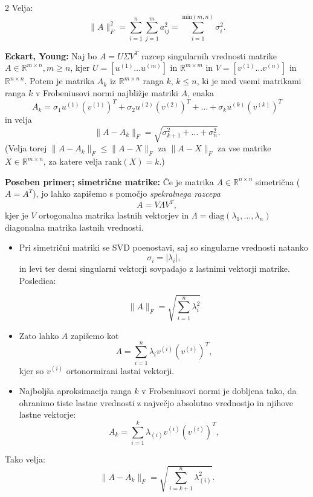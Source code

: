 \documentclass{article}
\begin{document}
\begin{multicols}{2}
	Velja:
	\[
		\|A\|_F^2 = \sum_{i=1}^{n} \sum_{j=1}^{m} a_{ij}^2 = \sum_{i=1}^{\text{min}(m,n)} \sigma_i^2.
	\]


	\textbf{Eckart, Young:} Naj bo \( A = U\Sigma V^T \) razcep singularnih vrednosti matrike \( A \in \mathbb{R}^{m \times n}, m \geq n \), kjer \( U = [u^{(1)} \ldots u^{(m)}] \) in \( \mathbb{R}^{m \times m} \) in \( V = [v^{(1)} \ldots v^{(n)}] \) in \( \mathbb{R}^{n \times n} \). Potem je matrika \( A_k \) iz \( \mathbb{R}^{m \times n} \) ranga \( k \), \( k \leq n \), ki je med vsemi matrikami ranga \( k \) v Frobeniusovi normi najbližje matriki \( A \), enaka
	\[
		A_k = \sigma_1 u^{(1)}(v^{(1)})^T + \sigma_2 u^{(2)}(v^{(2)})^T + \ldots + \sigma_k u^{(k)}(v^{(k)})^T
	\]
	in velja
	\[
		\| A - A_k \|_F = \sqrt{\sigma_{k+1}^2 + \ldots + \sigma_n^2}.
	\]
	(Velja torej \( \|A - A_k\|_F \leq \|A - X\|_F \) za \( \|A - X\|_F \) za vse matrike \( X \in \mathbb{R}^{m \times n} \), za katere velja \( \text{rank}(X) = k \).)

	\textbf{Poseben primer; simetrične matrike: }
	Če je matrika \( A \in \mathbb{R}^{n \times n} \) simetrična (\( A = A^T \)), jo lahko zapišemo s pomočjo
	\emph{spekralnega razcepa}
	\[
		A = V \Lambda V^T,
	\]
	kjer je \( V \) ortogonalna matrika lastnih vektorjev in \( \Lambda = \mathrm{diag}(\lambda_1, \ldots, \lambda_n) \) diagonalna matrika lastnih vrednosti.

	\begin{itemize}
		\item Pri simetrični matriki se SVD poenostavi, saj so singularne vrednosti natanko
		      \[
			      \sigma_i = |\lambda_i|,
		      \]
		      in levi ter desni singularni vektorji sovpadajo z lastnimi vektorji matrike.
		      Posledica:

		      \[
			      \|A\|_F = \sqrt{\sum_{i=1}^{n} \lambda_i^2}
		      \]
		\item Zato lahko \( A \) zapišemo kot
		      \[
			      A = \sum_{i=1}^n \lambda_i v^{(i)} (v^{(i)})^T,
		      \]
		      kjer so \( v^{(i)} \) ortonormirani lastni vektorji.
		\item Najboljša aproksimacija ranga \( k \) v Frobeniusovi normi je dobljena tako,
		      da ohranimo tiste lastne vrednosti z največjo absolutno vrednostjo in njihove lastne vektorje:
		      \[
			      A_k = \sum_{i=1}^k \lambda_{(i)} v^{(i)} (v^{(i)})^T,
		      \]
	\end{itemize}

	Tako velja:
	\[
		\| A - A_k \|_F = \sqrt{\sum_{i=k+1}^n \lambda_{(i)}^2}.
	\]


\end{multicols}
\end{document}
